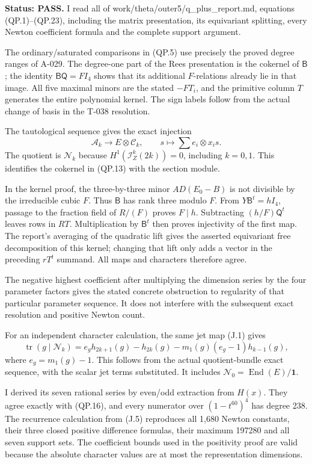 \documentclass[
  10pt,
]{article}
\begin{document}
\textbf{Status: PASS.} I read all of
work/theta/outer5/q\_plus\_report.md, equations (QP.1)--(QP.23),
including the matrix presentation, its equivariant splitting, every
Newton coefficient formula and the complete support argument.

The ordinary/saturated comparisons in (QP.5) use precisely the proved
degree ranges of A-029. The degree-one part of the Rees presentation is
the cokernel of \(\mathsf B\); the identity \(\mathsf B\mathsf Q=FI_4\)
shows that its additional \(F\)-relations already lie in that image. All
five maximal minors are the stated \(-FT_i\), and the primitive column
\(T\) generates the entire polynomial kernel. The sign labels follow
from the actual change of basis in the T-038 resolution.

The tautological sequence gives the exact injection \[
\mathcal A_k\longrightarrow E\otimes\mathcal C_k,\qquad
s\longmapsto\sum e_i\otimes x_i s.
\] The quotient is \(\mathcal N_k\) because
\(H^1(\mathcal I_Z^k(2k))=0\), including \(k=0,1\). This identifies the
cokernel in (QP.13) with the section module.

In the kernel proof, the three-by-three minor \(AD(E_0-B)\) is not
divisible by the irreducible cubic \(F\). Thus \(\mathsf B\) has rank
three modulo \(F\). From \(Y\mathsf B^t=hI_4\), passage to the fraction
field of \(R/(F)\) proves \(F\mid h\). Subtracting \((h/F)\mathsf Q^t\)
leaves rows in \(RT\). Multiplication by \(\mathsf B^t\) then proves
injectivity of the first map. The report's averaging of the quadratic
lift gives the asserted equivariant free decomposition of this kernel;
changing that lift only adds a vector in the preceding \(rT^t\) summand.
All maps and characters therefore agree.

The negative highest coefficient after multiplying the dimension series
by the four parameter factors gives the stated concrete obstruction to
regularity of that particular parameter sequence. It does not interfere
with the subsequent exact resolution and positive Newton count.

For an independent character calculation, the same jet map (J.1) gives
\[
\boxed{\operatorname{tr}(g\mid\mathcal N_k)
=e_g h_{2k+1}(g)-h_{2k}(g)
-m_1(g)(e_g-1)h_{k-1}(g),}
\tag{J.5}
\] where \(e_g=m_1(g)-1\). This follows from the actual quotient-bundle
exact sequence, with the scalar jet terms substituted. It includes
\(\mathcal N_0=\operatorname{End}(E)/\mathbf1\).

I derived its seven rational series by even/odd extraction from
\(H(x)\). They agree exactly with (QP.16), and every numerator over
\((1-t^{60})^4\) has degree 238. The recurrence calculation from (J.5)
reproduces all 1,680 Newton constants, their three closed positive
difference formulas, their maximum 197280 and all seven support sets.
The coefficient bounds used in the positivity proof are valid because
the absolute character values are at most the representation dimensions.
\end{document}
